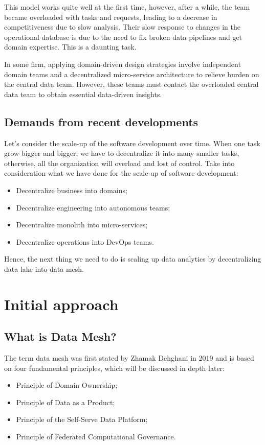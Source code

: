 \documentclass[12pt, a4paper]{book}
\begin{document}
This model works quite well at the first time, however, after a while, the team became overloaded with tasks and requests, leading to a decrease in competitiveness due to slow analysis. Their slow response to changes in the operational database is due to the need to fix broken data pipelines and get domain expertise. This is a daunting task. \cite{datamesh2022prologue,datameshweb}

In some firm, applying domain-driven design strategies involve independent domain teams and a decentralized micro-service architecture to relieve burden on the central data team. However, these teams must contact the overloaded central data team to obtain essential data-driven insights. \cite{datamesh2022prologue}

\subsection{Demands from recent developments}
Let's consider the scale-up of the software development over time. When one task grow bigger and bigger, we have to decentralize it into many smaller tasks, otherwise, all the organization will overload and lost of control. Take into consideration what we have done for the scale-up of software development:
	\begin{itemize}[nosep]
		\item Decentralize business into domains;
		\item Decentralize engineering into autonomous teams;
		\item Decentralize monolith into micro-services;
		\item Decentralize operations into DevOps teams.
	\end{itemize}

Hence, the next thing we need to do is scaling up data analytics by decentralizing data lake into data mesh.\cite{datameshweb}

\section{Initial approach}
\subsection{What is Data Mesh?}
The term data mesh was first stated by Zhamak Dehghani in 2019 and is based on four fundamental principles, which will be discussed in depth later:
	\begin{itemize}[nosep]
		\item Principle of Domain Ownership;
		\item Principle of Data as a Product;
		\item Principle of the Self-Serve Data Platform;
		\item Principle of Federated Computational Governance.
	\end{itemize}
\end{document}
